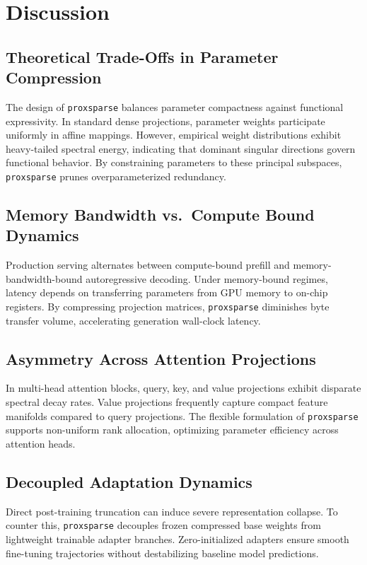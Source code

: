 \section{Discussion}

\subsection{Theoretical Trade-Offs in Parameter Compression}
The design of \texttt{proxsparse} balances parameter compactness against functional expressivity. In standard dense projections, parameter weights participate uniformly in affine mappings. However, empirical weight distributions exhibit heavy-tailed spectral energy, indicating that dominant singular directions govern functional behavior. By constraining parameters to these principal subspaces, \texttt{proxsparse} prunes overparameterized redundancy.

\subsection{Memory Bandwidth vs.\ Compute Bound Dynamics}
Production serving alternates between compute-bound prefill and memory-bandwidth-bound autoregressive decoding. Under memory-bound regimes, latency depends on transferring parameters from GPU memory to on-chip registers. By compressing projection matrices, \texttt{proxsparse} diminishes byte transfer volume, accelerating generation wall-clock latency.

\subsection{Asymmetry Across Attention Projections}
In multi-head attention blocks, query, key, and value projections exhibit disparate spectral decay rates. Value projections frequently capture compact feature manifolds compared to query projections. The flexible formulation of \texttt{proxsparse} supports non-uniform rank allocation, optimizing parameter efficiency across attention heads.

\subsection{Decoupled Adaptation Dynamics}
Direct post-training truncation can induce severe representation collapse. To counter this, \texttt{proxsparse} decouples frozen compressed base weights from lightweight trainable adapter branches. Zero-initialized adapters ensure smooth fine-tuning trajectories without destabilizing baseline model predictions.

